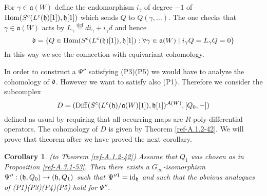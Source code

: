 \documentclass{amsart}
\numberwithin{equation}{section}
\let\cal\mathcal
\newtheorem{corollarys}[lemmas]{Corollary}
\theoremstyle{definition}
\theoremstyle{remark}
\begin{document}
For $\gamma\in {\mathfrak{a}}(W)$ define the endomorphism $i_\gamma$ of degree $-1$
of ${\operatorname {Hom}}(S^c(L^c(\frak{h})[1]),\frak{h}[1])$ which sends $Q$ to
$Q(\gamma,\ldots)$. The one checks that $\gamma\in {\mathfrak{a}}(W)$ acts by
$L_\gamma\overset{\text{def}}{=}di_\gamma+i_\gamma d$ and hence
\[
\frak{d}=\{Q\in {\operatorname {Hom}}(S^c(L^c(\frak{h})[1]),\frak{h}[1]): \forall 
\gamma\in {\mathfrak{a}}(W)\mid i_\gamma Q=L_\gamma Q=0\}
\]
In this way we see the connection with equivariant cohomology. 

In order to construct a $\Psi''$ satisfying (P3)(P5) we would have to
analyze the cohomology of $\frak{d}$. However we want to satisfy also
(P1). Therefore we consider the subcomplex
\begin{equation}
\label{ref-A.17-66}
D=({\operatorname{Diff}}(S^c(L^c(\frak{h})/{\mathfrak{a}}(W)[1]),\frak{h}[1])^{{\operatorname{{\cal A}}}(W)},[Q_0,-])
\end{equation}
defined as usual by requiring that all occurring maps are $R$-poly-differential
operators. The cohomology of $D$ is given by Theorem \ref{ref-A.1.2-42}. We
will prove that theorem after we have proved the next corollary.  
\begin{corollarys} (to Theorem
  \ref{ref-A.1.2-42}) \label{ref-A.6.1-67} Assume that $Q_1$ was
  chosen as in Proposition \ref{ref-A.3.1-53}. Then there exists a
  $G_\infty$-isomorphism $\Psi'':(\frak{h},Q_0)\rightarrow (\frak{h},Q_1)$ such
  that $\Psi^{\prime \prime 1}={\operatorname{id}}_{\frak{h}}$ and such that the
  obvious analogues of (P1)(P3)(P4)(P5) hold for $\Psi''$.
\end{corollarys}
\end{document}

